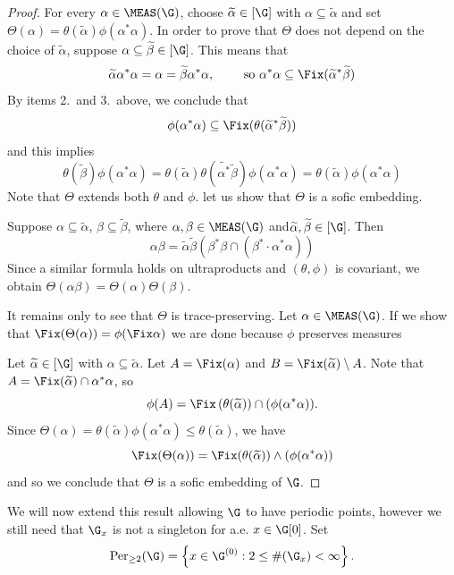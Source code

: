 \begin{proof}
For every $\alpha\in\MEAS(\G)$, choose $\widetilde{\alpha}\in[\G]$ with $\alpha\subseteq\widetilde{\alpha}$ and set$\Theta(\alpha)=\theta(\widetilde{\alpha})\phi(\alpha^*\alpha)$. In order to prove that $\Theta$ does not depend on the choice of $\widetilde{\alpha}$, suppose $\alpha\subseteq\widetilde{\beta}\in[\G]$. This means that
\[\widetilde{\alpha}\alpha^*\alpha=\alpha=\widetilde{\beta}\alpha^*\alpha,\qquad\text{ so }\alpha^*\alpha\subseteq\Fix(\widetilde{\alpha}^*\widetilde{\beta})\]
By items 2.\ and 3.\ above, we conclude that
\[\phi(\alpha^*\alpha)\subseteq\Fix(\theta(\widetilde{\alpha}^*\widetilde{\beta}))\]
and this implies
\[\theta(\widetilde{\beta})\phi(\alpha^*\alpha)=\theta(\widetilde{\alpha})\theta(\widetilde{\alpha^*}\widetilde{\beta})\phi(\alpha^*\alpha)=\theta(\widetilde{\alpha})\phi(\alpha^*\alpha)\]
Note that $\Theta$ extends both $\theta$ and $\phi$. let us show that $\Theta$ is a sofic embedding.

Suppose $\alpha\subseteq\widetilde{\alpha}$, $\beta\subseteq\widetilde{\beta}$, where $\alpha,\beta\in\MEAS(\G)$ and$\widetilde{\alpha},\widetilde{\beta}\in[\G]$. Then
\[\alpha\beta=\widetilde{\alpha}\widetilde{\beta}\left(\beta^*\beta\cap(\beta^*\cdot\alpha^*\alpha)\right)\]
Since a similar formula holds on ultraproducts and $(\theta,\phi)$ is covariant, we obtain $\Theta(\alpha\beta)=\Theta(\alpha)\Theta(\beta)$.

It remains only to see that $\Theta$ is trace-preserving. Let $\alpha\in\MEAS(\G)$. If we show that $\Fix(\Theta(\alpha))=\phi(\Fix\alpha)$ we are done because $\phi$ preserves measures

Let $\widetilde{\alpha}\in[\G]$ with $\alpha\subseteq\widetilde{\alpha}$. Let $A=\Fix(\alpha)$ and $B=\Fix(\widetilde{\alpha})\setminus A$. Note that $A=\Fix(\widetilde{\alpha})\cap\alpha^*\alpha$, so
\[\phi(A)=\Fix\left(\theta(\widetilde{\alpha})\right)\cap (\phi(\alpha^*\alpha)).\]
Since $\Theta(\alpha)=\theta(\widetilde{\alpha})\phi(\alpha^*\alpha)\leq\theta(\widetilde{\alpha})$, we have
\[\Fix(\Theta(\alpha))=\Fix(\theta(\widetilde{\alpha}))\land (\phi(\alpha^*\alpha))\]
and so we conclude that $\Theta$ is a sofic embedding of $\G$.\qedhere
\end{proof}

We will now extend this result allowing $\G$ to have periodic points, however we still need that $\G_x$ is not a singleton for a.e. $x\in\G[0]$. Set
\[\operatorname{Per}_{\geq 2}(\G)=\left\{x\in \G^{(0)}:2\leq\#(\G_x)<\infty\right\}.\]

